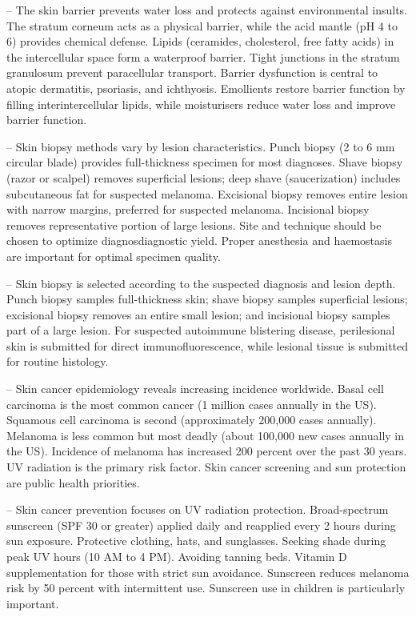 -- The skin barrier prevents water loss and protects against environmental insults. The stratum corneum acts as a physical barrier, while the acid mantle (pH 4 to 6) provides chemical defense. Lipids (ceramides, cholesterol, free fatty acids) in the intercellular space form a waterproof barrier. Tight junctions in the stratum granulosum prevent paracellular transport. Barrier dysfunction is central to atopic dermatitis, psoriasis, and ichthyosis. Emollients restore barrier function by filling interintercellular lipids, while moisturisers reduce water loss and improve barrier function.

-- Skin biopsy methods vary by lesion characteristics. Punch biopsy (2 to 6 mm circular blade) provides full-thickness specimen for most diagnoses. Shave biopsy (razor or scalpel) removes superficial lesions; deep shave (saucerization) includes subcutaneous fat for suspected melanoma. Excisional biopsy removes entire lesion with narrow margins, preferred for suspected melanoma. Incisional biopsy removes representative portion of large lesions. Site and technique should be chosen to optimize diagnosdiagnostic yield. Proper anesthesia and haemostasis are important for optimal specimen quality.

-- Skin biopsy is selected according to the suspected diagnosis and lesion depth. Punch biopsy samples full-thickness skin; shave biopsy samples superficial lesions; excisional biopsy removes an entire small lesion; and incisional biopsy samples part of a large lesion. For suspected autoimmune blistering disease, perilesional skin is submitted for direct immunofluorescence, while lesional tissue is submitted for routine histology.

-- Skin cancer epidemiology reveals increasing incidence worldwide. Basal cell carcinoma is the most common cancer (1 million cases annually in the US). Squamous cell carcinoma is second (approximately 200,000 cases annually). Melanoma is less common but most deadly (about 100,000 new cases annually in the US). Incidence of melanoma has increased 200 percent over the past 30 years. UV radiation is the primary risk factor. Skin cancer screening and sun protection are public health priorities.

-- Skin cancer prevention focuses on UV radiation protection. Broad-spectrum sunscreen (SPF 30 or greater) applied daily and reapplied every 2 hours during sun exposure. Protective clothing, hats, and sunglasses. Seeking shade during peak UV hours (10 AM to 4 PM). Avoiding tanning beds. Vitamin D supplementation for those with strict sun avoidance. Sunscreen reduces melanoma risk by 50 percent with intermittent use. Sunscreen use in children is particularly important.

